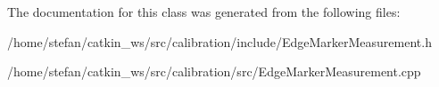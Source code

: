 \-The documentation for this class was generated from the following files\-:\begin{DoxyCompactItemize}
\item 
/home/stefan/catkin\-\_\-ws/src/calibration/include/\-Edge\-Marker\-Measurement.\-h\item 
/home/stefan/catkin\-\_\-ws/src/calibration/src/\-Edge\-Marker\-Measurement.\-cpp\end{DoxyCompactItemize}

